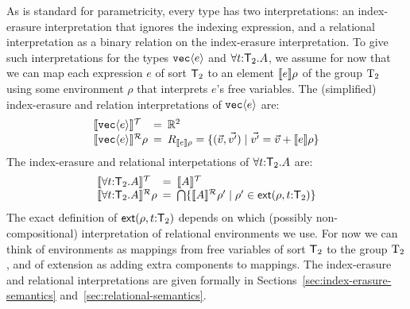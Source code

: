 As is standard for parametricity, every type has two interpretations:
an index-erasure interpretation that ignores the indexing expression,
and a relational interpretation as a binary relation on the
index-erasure interpretation. To give such interpretations for the
types $\textup{\texttt{vec}}\langle e \rangle$ and $\forall t\mathord:\mathsf{T}_2.A$,
we assume for now that we can map each expression $e$ of sort
$\mathsf{T}_2$ to an element $\llbracket e \rrbracket\rho$ of the group $\mathrm{T}_2$
using some environment $\rho$ that interprets $e$'s free
variables. The (simplified) index-erasure and relation interpretations
of $\textup{\texttt{vec}}\langle e \rangle$ are:
\begin{displaymath}
  \begin{array}{l@{\hspace{0.5em}=\hspace{0.5em}}l}
    \tySem{\tyPrim{vec}{e}} & \mathbb{R}^2
    \\ \rsem{\tyPrim{vec}{e}}{}\rho & R_{\sem{e}\rho} = \{
    (\vec{v},\vec{v'}) \sepbar \vec{v'} = \vec{v} + \sem{e}\rho \}
  \end{array}
\end{displaymath}
The index-erasure and relational interpetations of 
$\forall t\mathord:\mathsf{T}_2.A$ are:
\begin{displaymath}
  \begin{array}{l@{\hspace{0.5em}=\hspace{0.5em}}l}
    \tySem{\forall t\mathord:\SynTransl{2}.A} & \tySem{A}
    \\ \rsem{\forall t\mathord:\SynTransl{2}.A}{}\rho & \bigcap\{
    \rsem{A}{}{\rho'} \sepbar \rho' \in
    \extends{\rho}{t\mathord:\SynTransl{2}} \}
  \end{array}
\end{displaymath}
The exact definition of $\mathsf{ext}(\rho,t\mathord:\mathsf{T}_2)$
depends on which (possibly non-compositional) interpretation of
relational environments we use. For now we can think of environments
as mappings from free variables of sort $\mathsf{T}_2$ to the group
$\mathrm{T}_2$, and of extension as adding extra components to
mappings. The index-erasure and relational interpretations are given
formally in Sections~\ref{sec:index-erasure-semantics}
and~\ref{sec:relational-semantics}. %

